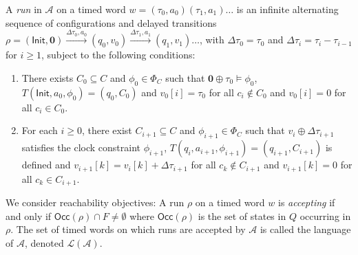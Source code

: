 \documentclass[letterpaper, 10 pt, conference]{ieeeconf}
\newcommand{\calA}{\mathcal{A}}
\newcommand{\Occ}{\mathsf{Occ}}
\newcommand{\init}{\mathsf{Init}}
\begin{document}
A \emph{run} in $\calA$ on a timed word
$w=(\tau_0, a_0 )(\tau_1,a_1)\ldots $ is an infinite alternating
sequence of configurations and delayed transitions
$\rho=(\init, \bm 0)\xrightarrow{\Delta \tau_0, a_0}
(q_0,v_0)\xrightarrow{\Delta \tau_1, a_1}(q_1,v_1) \ldots $,
with $\Delta \tau_0=\tau_0$ and $\Delta\tau_i = \tau_{i}-\tau_{i-1}$
for $i \ge 1$, subject to the following conditions:
\begin{enumerate}

\item There exists $C_0 \subseteq C$ and $\phi_0 \in \Phi_C$ such
  that $\bm 0 \oplus \tau_0 \models \phi_0$,
  $T(\init, a_0, \phi_0 ) = (q_0, C_0)$ and $v_0[i]= \tau_0$ for
  all $c_i \notin C_0$ and $v_0[i]=0$ for all $c_i\in C_0$.
\item For each $ i \ge 0 $, there exist $C_{i+1}\subseteq C$ and
  $\phi_{i+1}\in \Phi_C$ such that $v_i \oplus \Delta \tau_{i+1}$
  satisfies the clock constraint $\phi_{i+1}$,
  $T(q_i, a_{i+1}, \phi_{i+1})=(q_{i+1}, C_{i+1})$ is defined and
  $v_{i+1}[k]=v_{i}[k]+\Delta\tau_{i+1}$ for all $c_k\notin C_{i+1}$
  and $v_{i+1}[k]=0$ for all $c_k\in C_{i+1}$.
\end{enumerate} 


We consider reachability objectives: A run $\rho$ on a timed word $w$
is \emph{accepting} if and only if $\Occ(\rho)\cap F\ne \emptyset$
where $\Occ(\rho)$ is the set of states in $Q$ occurring in
$\rho$. The set of timed words on which runs are accepted by $\calA$
is called the language of $\calA$, denoted $\mathcal{L}(\calA)$.
\end{document}
